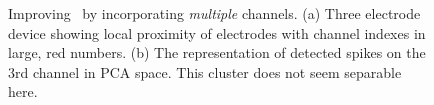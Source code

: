 \begin{center}
\begin{figure}[h!]
\begin{subfigure}[b]{.5\textwidth}
\caption{}
\label{3chpca}
\end{subfigure}
\caption{
Improving \smug\ by incorporating \emph{multiple} channels.
(a) Three electrode device showing local proximity of electrodes with channel indexes in large, red numbers. 
(b) The representation of detected spikes on the 3rd channel in PCA space. This cluster does not seem separable here.
}
\end{figure}
\end{center}


% 



